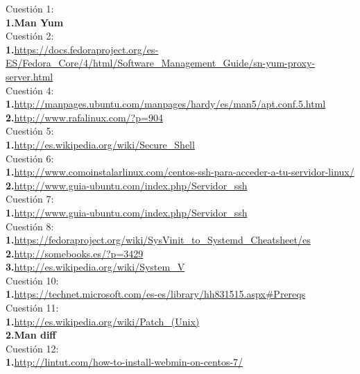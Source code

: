 \documentclass[a4paper, 11pt]{article} %
\begin{document}
\begin{thebibliography}{X}
 Cuestión 1:\\ 
 \textbf{1.}\textbf{Man Yum}\\
 Cuestión 2:\\ 
 \textbf{1.}\url{https://docs.fedoraproject.org/es-ES/Fedora_Core/4/html/Software_Management_Guide/sn-yum-proxy-server.html}\\
   Cuestión 4:\\ 
 \textbf{1.}\url{http://manpages.ubuntu.com/manpages/hardy/es/man5/apt.conf.5.html }\\
  \textbf{2.}\url{http://www.rafalinux.com/?p=904}\\
  Cuestión 5:\\ 
 \textbf{1.}\url{http://es.wikipedia.org/wiki/Secure_Shell}\\
   Cuestión 6:\\ 
 \textbf{1.}\url{http://www.comoinstalarlinux.com/centos-ssh-para-acceder-a-tu-servidor-linux/}\\
  \textbf{2.}\url{http://www.guia-ubuntu.com/index.php/Servidor_ssh}\\
     Cuestión 7:\\ 
  \textbf{1.}\url{http://www.guia-ubuntu.com/index.php/Servidor_ssh}\\
   Cuestión 8:\\ 
 \textbf{1.}\url{https://fedoraproject.org/wiki/SysVinit_to_Systemd_Cheatsheet/es}\\
  \textbf{2.}\url{http://somebooks.es/?p=3429}\\
  \textbf{3.}\url{http://es.wikipedia.org/wiki/System_V}\\
 Cuestión 10:\\ 
 \textbf{1.}\url{https://technet.microsoft.com/es-es/library/hh831515.aspx#Prereqs}\\
  Cuestión 11:\\ 
 \textbf{1.}\url{http://es.wikipedia.org/wiki/Patch_(Unix)}\\
  \textbf{2.}\textbf{Man diff}\\
   Cuestión 12:\\ 
 \textbf{1.}\url{http://lintut.com/how-to-install-webmin-on-centos-7/}\\
\end{thebibliography}
\end{document}
